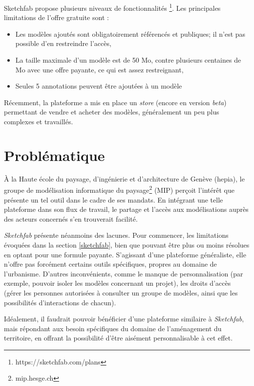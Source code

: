 
Sketchfab propose plusieurs niveaux de fonctionnalités \footnote{https://sketchfab.com/plans}. Les principales limitations de l'offre gratuite sont :
\begin{itemize}
    \item Les modèles ajoutés sont obligatoirement référencés et publiques; il n'est pas possible d'en restreindre l'accès,
    \item La taille maximale d'un modèle est de 50 Mo, contre plusieurs centaines de Mo avec une offre payante, ce qui est assez restreignant,
    \item Seules 5 annotations peuvent être ajoutées à un modèle
\end{itemize}

Récemment, la plateforme a mis en place un \textit{store} (encore en version \textit{beta}) permettant de vendre et acheter des modèles, généralement un peu plus complexes et travaillés.

\section{Problématique}

À la Haute école du paysage, d'ingénierie et d'architecture de Genève (hepia), le groupe de modélisation informatique du paysage\footnote{mip.hesge.ch} (MIP) perçoit l'intérêt que présente un tel outil dans le cadre de ses mandats. En intégrant une telle plateforme dans son flux de travail, le partage et l'accès aux modélisations auprès des acteurs concernés s'en trouverait facilité.

\textit{Sketchfab} présente néanmoins des lacunes. Pour commencer, les limitations évoquées dans la section \ref{sketchfab}, bien que pouvant être plus ou moins résolues en optant pour une formule payante.
S'agissant d'une plateforme généraliste, elle n'offre pas forcément certains outils spécifiques, propres au domaine de l'urbanisme. D'autres inconvénients, comme le manque de personnalisation (par exemple, pouvoir isoler les modèles concernant un projet), les droits d'accès (gérer les personnes autorisées à consulter un groupe de modèles, ainsi que les possibilités d'interactions de chacun).



Idéalement, il faudrait pouvoir bénéficier d'une plateforme similaire à \textit{Sketchfab}, mais répondant aux besoin spécifiques du domaine de l'aménagement du territoire, en offrant la possibilité d'être aisément personnalisable à cet effet.

